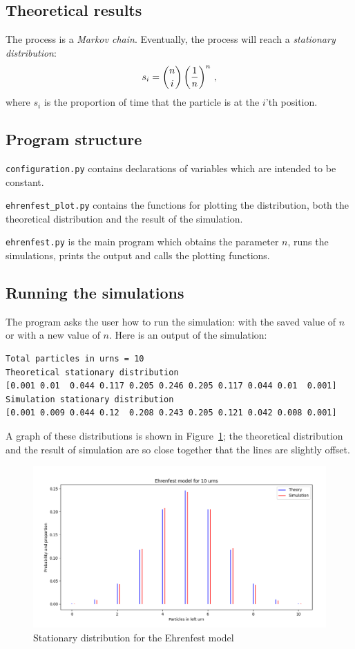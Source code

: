 \subsection{Theoretical results}

The process is a \emph{Markov chain}. Eventually, the process will reach a \emph{stationary distribution}:
\[
s_i=\displaystyle{n \choose i}\left(\frac{1}{n}\right)^n\,,
\]
where $s_i$ is the proportion of time that the particle is at the $i$'th position.

\subsection{Program structure}

\verb+configuration.py+ contains declarations of variables which are intended to be constant. 

\verb+ehrenfest_plot.py+ contains the functions for plotting the distribution, both the theoretical distribution and the result of the simulation.

\verb+ehrenfest.py+ is the main program which obtains the parameter $n$, runs the simulations, prints the output and calls the plotting functions.

\subsection{Running the simulations}

The program asks the user how to run the simulation: with the saved value of $n$ or with a new value of $n$. Here is an output of the simulation:
\begin{verbatim}
Total particles in urns = 10
Theoretical stationary distribution
[0.001 0.01  0.044 0.117 0.205 0.246 0.205 0.117 0.044 0.01  0.001]
Simulation stationary distribution
[0.001 0.009 0.044 0.12  0.208 0.243 0.205 0.121 0.042 0.008 0.001]
\end{verbatim}
A graph of these distributions is shown in Figure~\ref{f.ehrenfest1}; the theoretical distribution and the result of simulation are so close together that the lines are slightly offset.

\begin{figure}
\begin{center}
\includegraphics[width=\textwidth]{ehrenfest-01}
\caption{Stationary distribution for the Ehrenfest model}\label{f.ehrenfest1}
\end{center}
\end{figure}

